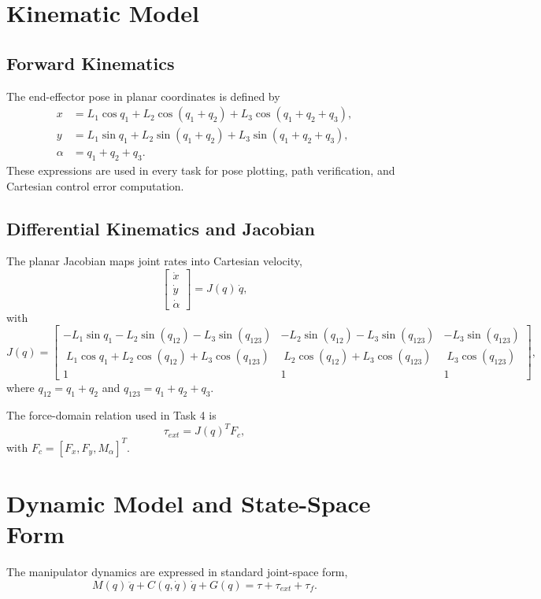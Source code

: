 \documentclass[11pt]{article}
\begin{document}
\section{Kinematic Model}
\subsection{Forward Kinematics}
The end-effector pose in planar coordinates is defined by
\begin{align}
x &= L_1\cos q_1 + L_2\cos(q_1+q_2) + L_3\cos(q_1+q_2+q_3),\\
y &= L_1\sin q_1 + L_2\sin(q_1+q_2) + L_3\sin(q_1+q_2+q_3),\\
\alpha &= q_1 + q_2 + q_3.
\end{align}
These expressions are used in every task for pose plotting, path verification, and Cartesian control error computation.

\subsection{Differential Kinematics and Jacobian}
The planar Jacobian maps joint rates into Cartesian velocity,
\begin{equation}
\begin{bmatrix}\dot x\\\dot y\\\dot\alpha\end{bmatrix} = J(q)\,\dot q,
\end{equation}
with
\begin{equation}
J(q)=
\begin{bmatrix}
- L_1\sin q_1 - L_2\sin(q_{12}) - L_3\sin(q_{123}) & - L_2\sin(q_{12}) - L_3\sin(q_{123}) & -L_3\sin(q_{123})\\
\;L_1\cos q_1 + L_2\cos(q_{12}) + L_3\cos(q_{123}) & \;L_2\cos(q_{12}) + L_3\cos(q_{123}) & \;L_3\cos(q_{123})\\
1 & 1 & 1
\end{bmatrix},
\end{equation}
where $q_{12}=q_1+q_2$ and $q_{123}=q_1+q_2+q_3$.

The force-domain relation used in Task 4 is
\begin{equation}
\tau_{ext}=J(q)^T F_c,
\end{equation}
with $F_c=[F_x,F_y,M_\alpha]^T$.

\section{Dynamic Model and State-Space Form}
The manipulator dynamics are expressed in standard joint-space form,
\begin{equation}
M(q)\,\ddot q + C(q,\dot q)\,\dot q + G(q) = \tau + \tau_{ext} + \tau_f.
\label{eq:eom}
\end{equation}
\end{document}
